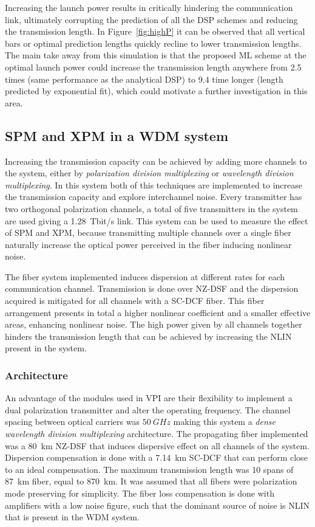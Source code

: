 Increasing the launch power results in critically hindering the communication link, ultimately corrupting the prediction of all the DSP schemes and reducing the transmission length. In Figure~\ref{fig:highP} it can be observed that all vertical bars or optimal prediction lengths quickly recline to lower transmission lengths. The main take away from this simulation is that the proposed ML scheme at the optimal launch power could increase the transmission length anywhere from 2.5 times (same performance as the analytical DSP) to 9.4 time longer (length predicted by exponential fit), which could motivate a further investigation in this area.




\subsection{SPM and XPM in a WDM system}

Increasing the transmission capacity can be achieved by adding more channels to the system, either by \textit{polarization division multiplexing} or \textit{wavelength division multiplexing}. In this system both of this techniques are implemented to increase the transmission capacity and explore interchannel noise. Every transmitter has two orthogonal polarization channels, a total of five transmitters in the system are used giving a 1.28~Tbit/s link. This system can be used to measure the effect of SPM and XPM, because transmitting multiple channels over a single fiber naturally increase the optical power perceived in the fiber inducing nonlinear noise. 

The fiber system implemented  induces dispersion at different rates for each communication channel. Transmission is done over NZ-DSF and the dispersion acquired is mitigated for all channels with a SC-DCF fiber. This fiber arrangement presents in total a higher nonlinear coefficient and a smaller effective areas, enhancing nonlinear noise. The high power given by all channels together hinders the transmission length that can be achieved by increasing the NLIN present in the system.

\subsubsection{Architecture}

An advantage of the modules used in VPI are their flexibility to implement a dual polarization transmitter and  alter the operating frequency. The channel spacing between optical carriers was $50~GHz$ making this system a \textit{dense wavelength division multiplexing} architecture. The propagating fiber implemented was a 80~km NZ-DSF that induces dispersive effect on all channels of the system. Dispersion compensation is done with a 7.14~km SC-DCF that can perform close to an ideal compensation. The maximum transmission length was 10 spans of 87~km fiber, equal to 870~km. It was assumed that all fibers were polarization mode preserving for simplicity. The fiber loss compensation is done with amplifiers with a low noise figure, such that the dominant source of noise is NLIN that is present in the WDM system.  


